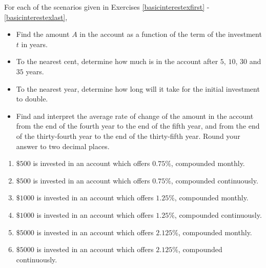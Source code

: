 \label{ExercisesforApplicationsofExponentialandLogarithmicFunctions}

For each of the scenarios given in Exercises \ref{basicinterestexfirst} - \ref{basicinterestexlast}, 

\begin{itemize}

\item  Find the amount $A$ in the account as a function of the term of the investment $t$ in years. 

\item  To the nearest cent, determine how much is in the account after $5$, $10$, $30$ and $35$ years.  

\item  To the nearest year, determine how long will it take for the initial investment to double.  

\item  Find and interpret the average rate of change of the amount in the account from the end of
the fourth year to the end of the fifth year, and from the end of the thirty-fourth year to the
end of the thirty-fifth year.  Round your answer to two decimal places.

\end{itemize} 

\begin{enumerate}

\item  $\$500$ is invested in an account which offers $0.75 \%$, compounded monthly. \label{basicinterestexfirst}

\item  $\$500$ is invested in an account which offers $0.75 \%$, compounded continuously.

\item  $\$1000$ is invested in an account which offers $1.25 \%$, compounded monthly.

\item  $\$1000$ is invested in an account which offers $1.25 \%$, compounded continuously.

\item  $\$5000$ is invested in an account which offers $2.125 \%$, compounded monthly.

\item  $\$5000$ is invested in an account which offers $2.125 \%$, compounded continuously. \label{basicinterestexlast}

\setcounter{HW}{\value{enumi}}
\end{enumerate}

